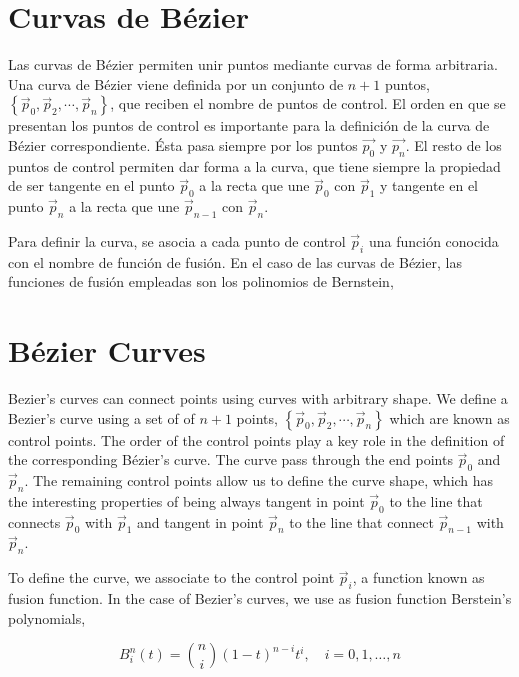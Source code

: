 \begin{paracol}{2}
\section{Curvas de Bézier}
Las curvas de Bézier permiten unir puntos mediante curvas de forma arbitraria.  Una curva de Bézier viene definida por un conjunto de $n+1$ puntos, $\left\lbrace\vec{p}_0, \vec{p}_2, \cdots, \vec{p}_n\right\rbrace$, que reciben el nombre de puntos de control. El orden en que se presentan los puntos de control es importante para la definición de la curva de Bézier correspondiente. Ésta pasa siempre por los puntos $\vec{p_0}$ y $\vec{p_n}$. El resto de los puntos de control permiten dar forma a la curva, que tiene siempre la propiedad de ser tangente en el punto $\vec{p}_0$ a la recta que une $\vec{p}_0$ con $\vec{p}_1$ y tangente en el punto $\vec{p}_n$ a la recta que une $\vec{p}_{n-1}$ con $\vec{p}_n$.

Para definir la curva, se asocia a cada punto de control $\vec{p}_i$ una función conocida con el nombre de función de fusión. En el caso de las curvas de Bézier, las funciones de fusión empleadas son los polinomios de Bernstein, 
\switchcolumn	
\section{Bézier Curves} 
Bezier's curves can connect points using curves with arbitrary shape. We define a Bezier's curve using a set of of $n+1$ points, $\left\lbrace\vec{p}_0, \vec{p}_2, \cdots, \vec{p}_n\right\rbrace$ which are known as control points. The order of the control points play a key role in the definition of the corresponding Bézier's curve. The curve pass through the end points $\vec{p}_0$ and $\vec{p}_n$. The remaining control points allow us to define the curve shape, which has the interesting properties of being always tangent in point $\vec{p}_0$ to the line that connects $\vec{p}_0$ with $\vec{p}_1$ and tangent in point $\vec{p}_n$ to the line that connect $\vec{p}_{n-1}$ with $\vec{p}_n$.

 To define the curve, we associate to the control point $\vec{p}_i$, a function known as fusion function. In the case of Bezier's curves, we use as fusion function Berstein's polynomials,   
\end{paracol}
\begin{equation*}
B_i^n (t)=\binom{n}{i}\left(1-t\right)^{n-i}t^i, \quad i = 0, 1, \dots, n
\end{equation*}
